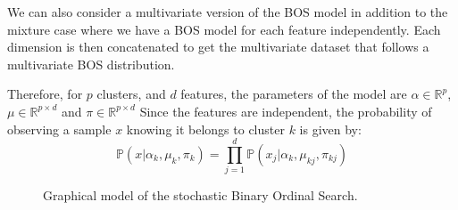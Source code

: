 \documentclass[a4paper,12pt]{article}
\begin{document}
We can also consider a multivariate version of the BOS model in addition to the mixture case where we have a BOS model for each feature independently. Each dimension is then concatenated to get the multivariate dataset that follows a multivariate BOS distribution.

Therefore, for $p$ clusters, and $d$ features, the parameters of the model are $\alpha \in \mathbb{R}^p$, $\mu \in \mathbb{R}^{p\times d}$ and $\pi \in \mathbb{R}^{p\times d}$
Since the features are independent, the probability of observing a sample $x$ knowing it belongs to cluster $k$ is given by:
\begin{equation}
    \mathbb{P}(x | \alpha_k, \mu_{k}, \pi_k) = \prod_{j=1}^d \mathbb{P}(x_j | \alpha_k, \mu_{kj}, \pi_{kj})
\end{equation}

\begin{figure}[htbp]
\centering
\begin{adjustbox}{width=\textwidth}
\end{adjustbox}
\caption{Graphical model of the stochastic Binary Ordinal Search.}
\label{fig:graphical_model}
\end{figure}
\end{document}
